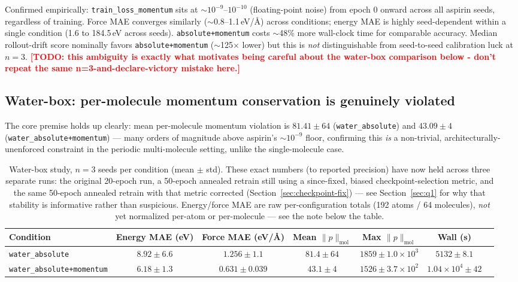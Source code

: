 \documentclass[11pt]{article}
\newcommand{\todo}[1]{\textcolor{red}{\textbf{[TODO: #1]}}}
\begin{document}
Confirmed empirically: \texttt{train\_loss\_momentum} sits at
$\sim 10^{-9}$--$10^{-10}$ (floating-point noise) from epoch 0 onward across
all aspirin seeds, regardless of training. Force MAE converges similarly
($\sim$0.8--1.1\,eV/\AA) across conditions; energy MAE is highly
seed-dependent within a single condition (1.6 to 184.5\,eV across seeds).
\texttt{absolute+momentum} costs $\sim$48\% more wall-clock time for
comparable accuracy. Median rollout-drift score nominally favors
\texttt{absolute+momentum} ($\sim$125$\times$ lower) but this is
\emph{not} distinguishable from seed-to-seed calibration luck at $n=3$.
\todo{this ambiguity is exactly what motivates being careful about the
water-box comparison below - don't repeat the same n=3-and-declare-victory
mistake here.}

\subsection{Water-box: per-molecule momentum conservation is genuinely
violated}
\label{sec:waterbox-results}

The core premise holds up clearly: mean per-molecule momentum violation is
$81.41 \pm 64$ (\texttt{water\_absolute}) and $43.09 \pm 4$
(\texttt{water\_absolute+momentum}) --- many orders of magnitude above
aspirin's $\sim 10^{-9}$ floor, confirming this \emph{is} a non-trivial,
architecturally-unenforced constraint in the periodic multi-molecule
setting, unlike the single-molecule case.

\begin{table}[h]
\centering
\caption{Water-box study, $n=3$ seeds per condition (mean $\pm$ std). These
exact numbers (to reported precision) have now held across three separate
runs: the original 20-epoch run, a 50-epoch annealed retrain still using a
since-fixed, biased checkpoint-selection metric, and the same 50-epoch
annealed retrain with that metric corrected (Section~\ref{sec:checkpoint-fix})
--- see Section~\ref{sec:q1} for why that stability is informative rather
than suspicious. Energy/force MAE are raw per-configuration totals (192
atoms / 64 molecules), \emph{not} yet normalized per-atom or per-molecule
--- see the note below the table.}
\label{tab:waterbox-summary}
\begin{tabular}{lcccccc}
\toprule
Condition & Energy MAE (eV) & Force MAE (eV/\AA) & Mean $\lVert p \rVert_{\mathrm{mol}}$ & Max $\lVert p \rVert_{\mathrm{mol}}$ & Wall (s) \\
\midrule
\texttt{water\_absolute}          & $8.92 \pm 6.6$  & $1.256 \pm 1.1$   & $81.4 \pm 64$ & $1859 \pm 1.0{\times}10^3$ & $5132 \pm 8.1$ \\
\texttt{water\_absolute+momentum} & $6.18 \pm 1.3$  & $0.631 \pm 0.039$ & $43.1 \pm 4$  & $1526 \pm 3.7{\times}10^2$ & $1.04{\times}10^4 \pm 42$ \\
\bottomrule
\end{tabular}
\end{table}
\end{document}
